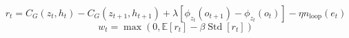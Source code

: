 \[
r_t = C_G(z_t,h_t)-C_G(z_{t+1},h_{t+1}) + \lambda[\phi_{z_t}(o_{t+1})-\phi_{z_t}(o_t)] - \eta n_{\mathrm{loop}}(e_t)
\]
\[
w_t=\max(0,\mathbb E[r_t]-\beta\operatorname{Std}[r_t])
\]

